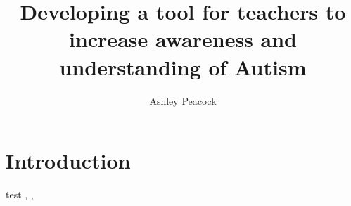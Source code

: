 \documentclass[11pt]{report}
\begin{document}
\title{Developing a tool for teachers to increase awareness and understanding of Autism}
\author{Ashley Peacock}
\maketitle

\tableofcontents


\section{Introduction}

test \cite{Matson_Kozlowski_2011}, \cite{Mayes_et_al_2013} , \cite{Gabriels_et_al_2008}

\begin{appendices}


  
\end{appendices}

 


\end{document}
